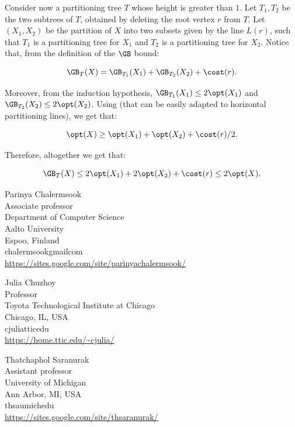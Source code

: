 \documentclass{toc}
\begin{document}
Consider now a partitioning tree $T$ whose height is greater than $1$. Let $T_1,T_2$ be the two subtrees of $T$, obtained by deleting the root vertex $r$ from $T$. Let $(X_1,X_2)$ be the partition of $X$ into two subsets given by the line $L(r)$, such that $T_1$ is a partitioning tree for $X_1$ and $T_2$ is a partitioning tree for $X_2$. Notice that, from the definition of the $\GB$ bound:

\[\GB_T(X)=\GB_{T_1}(X_1)+\GB_{T_2}(X_2)+\cost(r).\]

Moreover, from the induction hypothesis, $\GB_{T_1}(X_1)\leq 2\opt(X_1)$ and $\GB_{T_2}(X_2)\leq 2\opt(X_2)$.
Using  (that can be easily adapted to horizontal partitioning lines), we get that:


\[\opt(X)\geq \opt(X_1)+\opt(X_2)+\cost(r)/2.\]

Therefore, altogether we get that:


\[\GB_T(X)\leq 2\opt(X_1)+2\opt(X_2)+\cost(r)\leq 2\opt(X).  \]

\nocite{conf-version}

%
%


%
%
%
%
%
\begin{tocauthors}
%
\begin{tocinfo}[chalermsook]  %
 Parinya Chalermsook\\
 Associate professor\\
 Department of Computer Science \\
 Aalto University\\
 Espoo, Finland\\
 chalermsook\tocat{}gmail\tocdot{}com \\   %
 \url{https://sites.google.com/site/parinyachalermsook/} %
\end{tocinfo}
\begin{tocinfo}[chuzhoy]
  Julia Chuzhoy\\
  Professor\\
  Toyota Technological Institute at Chicago \\
  Chicago, IL, USA\\
  cjulia\tocat{}ttic\tocdot{}edu \\
  \url{https://home.ttic.edu/~cjulia/}
\end{tocinfo}

\begin{tocinfo}[saranurak]
  Thatchaphol Saranurak\\
  Assistant professor\\
  University of Michigan \\
  Ann Arbor, MI, USA\\
  thsa\tocat{}umich\tocdot{}edu \\
  \url{https://sites.google.com/site/thsaranurak/}
\end{tocinfo}
\end{tocauthors}
\end{document}
